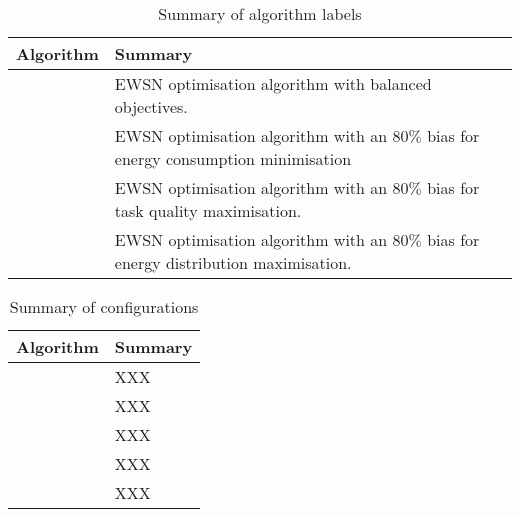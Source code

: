 \begin{table}[h]
	\begin{tabular}
		{|p{}|p{}|}
		\hline
		\textbf{Algorithm} & \textbf{Summary}\\
		\hline
		\algorithmBalanced{}{} &  EWSN optimisation algorithm with balanced objectives. \\
		\algorithmEnergy{}{} & EWSN optimisation algorithm with an $80\%$ bias for energy consumption minimisation \\
		\algorithmQuality{}{} & EWSN optimisation algorithm with an $80\%$ bias for task quality maximisation. \\
		\algorithmDistribution{}{} & EWSN optimisation algorithm with an $80\%$ bias for energy distribution maximisation. \\
		\hline
	\end{tabular}
	\captionsetup{labelfont=bf,singlelinecheck=on}
	\caption{Summary of algorithm labels}
	\label{table:summary_of_algorithms}
\end{table}

\begin{table}[h]
	\begin{tabular}
		{|p{}|p{}|}
		\hline
		\textbf{Algorithm} & \textbf{Summary}\\
		\hline
		\algorithmBalanced{}{} & XXX  \\
		\algorithmBalancedExt{}{} & XXX  \\
		\algorithmEnergy{}{} & XXX \\
		\algorithmQuality{}{} & XXX \\
		\algorithmDistribution{}{} &  XXX \\
		\hline
	\end{tabular}
	\captionsetup{labelfont=bf,singlelinecheck=on}
	\caption{Summary of configurations}
	\label{table:summary_of_configurations}
\end{table}

